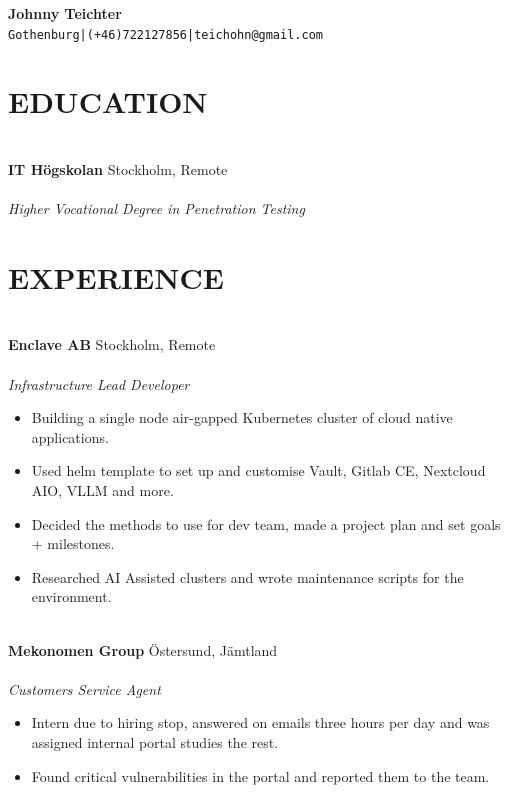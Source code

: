 \documentclass[10pt, a4paper]{article}
\begin{document}
\begin{center}
\textbf{Johnny Teichter}\\
\texttt{Gothenburg|(+46)722127856|teichohn@gmail.com}
\end{center}
\section*{EDUCATION}
\texttt{}\\[-0.5cm]
\textbf{IT Högskolan} \hfill Stockholm, Remote\\
\noindent{}\\
\textit{Higher Vocational Degree in Penetration Testing}

\section*{EXPERIENCE}
\texttt{}\\[-0.5cm]
\textbf{Enclave AB} \hfill Stockholm, Remote\\
\noindent{}\\
\textit{Infrastructure Lead Developer}\\
\begin{itemize}[leftmargin=0.3cm, itemsep=0.1cm]
\item Building a single node air-gapped Kubernetes cluster of cloud native applications.
\item Used helm template to set up and customise Vault, Gitlab CE, Nextcloud AIO, VLLM and more.
\item Decided the methods to use for dev team, made a project plan and set goals + milestones.
\item Researched AI Assisted clusters and wrote maintenance scripts for the environment.
\end{itemize}
\texttt{}\\[-0.2cm]
\textbf{Mekonomen Group} \hfill Östersund, Jämtland\\
\noindent{}\\
\textit{Customers Service Agent}\\
\begin{itemize}[leftmargin=0.3cm, itemsep=0.1cm]
\item Intern due to hiring stop, answered on emails three hours per day and was assigned internal portal studies the rest.
\item Found critical vulnerabilities in the portal and reported them to the team. 
\end{itemize}
\end{document}
